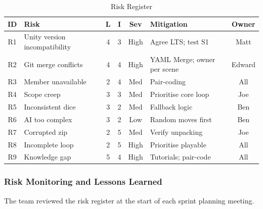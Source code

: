 \begin{table}[H]
\centering
\footnotesize
\setlength{\tabcolsep}{3pt}
\begin{tabular}{|c|p{2.8cm}|c|c|c|p{3cm}|c|}
\hline
\textbf{ID} & \textbf{Risk} & \textbf{L} & \textbf{I} & \textbf{Sev} & \textbf{Mitigation} & \textbf{Owner} \\ \hline
R1 & Unity version incompatibility & 4 & 3 & High & Agree LTS; test S1 & Matt \\ \hline
R2 & Git merge conflicts & 4 & 4 & High & YAML Merge; owner per scene & Edward \\ \hline
R3 & Member unavailable & 2 & 4 & Med & Pair-coding & All \\ \hline
R4 & Scope creep & 3 & 3 & Med & Prioritise core loop & Joe \\ \hline
R5 & Inconsistent dice & 3 & 2 & Med & Fallback logic & Ben \\ \hline
R6 & AI too complex & 3 & 2 & Low & Random moves first & Ben \\ \hline
R7 & Corrupted zip & 2 & 5 & Med & Verify unpacking & Joe \\ \hline
R8 & Incomplete loop & 2 & 5 & High & Prioritise playable & All \\ \hline
R9 & Knowledge gap & 5 & 4 & High & Tutorials; pair-code & All \\ \hline
\end{tabular}
\caption{Risk Register}
\label{tab:risk_register}
\end{table}

\subsubsection*{Risk Monitoring and Lessons Learned}

The team reviewed the risk register at the start of each sprint planning meeting.

